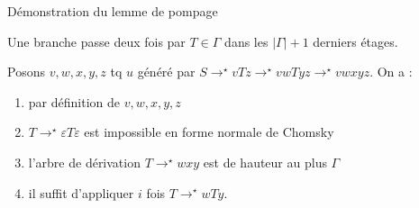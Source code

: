 \begin{frame}{Démonstration du lemme de pompage}
{    Une branche passe deux fois par $T \in \Gamma$ dans les $|\Gamma| + 1$ derniers étages.

    \alert{Posons $v, w, x, y, z$} tq $u$ généré par $S \rightarrow^\star v T z \rightarrow^\star v w T y z \rightarrow^\star v w x y z$. On a :

    \vspace{1mm}
    \begin{enumerate}
    \item {} par définition de $v, w, x, y, z$
    \item {} $T \rightarrow^\star \varepsilon T \varepsilon$ est impossible en forme normale de Chomsky
    \item {} l'arbre de dérivation $T \rightarrow^\star w x y$ est de hauteur au plus $\Gamma$
    \item {} il suffit d'appliquer $i$ fois $T \rightarrow^\star w T y$.
    \end{enumerate}
  }

  
\end{frame}


\endgroup
